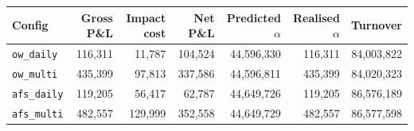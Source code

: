 \begin{tabular}{lrrrrrr}
\toprule
Config & Gross P\&L & Impact cost & Net P\&L & Predicted $\alpha$ & Realised $\alpha$ & Turnover \\
\midrule
\texttt{ow\_daily} & 116,311 & 11,787 & 104,524 & 44,596,330 & 116,311 & 84,003,822 \\
\texttt{ow\_multi} & 435,399 & 97,813 & 337,586 & 44,596,811 & 435,399 & 84,020,323 \\
\texttt{afs\_daily} & 119,205 & 56,417 & 62,787 & 44,649,726 & 119,205 & 86,576,189 \\
\texttt{afs\_multi} & 482,557 & 129,999 & 352,558 & 44,649,729 & 482,557 & 86,577,598 \\
\bottomrule
\end{tabular}